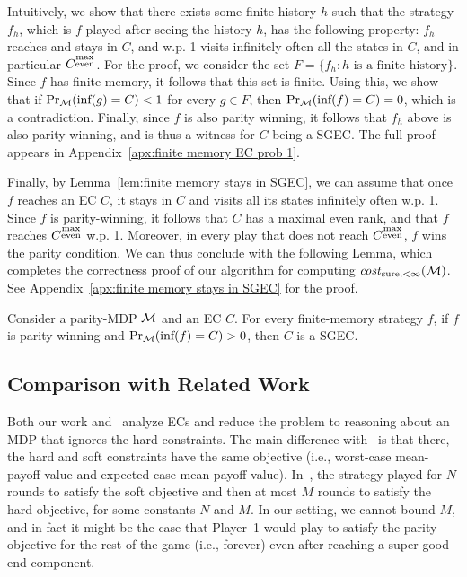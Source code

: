 \documentclass[runningheads,a4paper]{llncs}
\newcommand{\set}[1]{{\{#1\}}}
\newcommand{\M}{{\cal M}}
\newcommand{\Inf}{\mbox{inf}}
\newcommand{\costsf}{{\it cost}_{\rm sure,<\infty}}
\newcommand{\sgec}{{SGEC}\xspace}
\newcommand{\me}{{\substack{\rm max\\ \rm even}}}
\begin{document}
Intuitively, we show that there exists some finite history $h$ such that the strategy $f_h$, which is $f$ played after seeing the history $h$, has the following property: $f_h$ reaches and stays in $C$, and w.p. 1 visits infinitely often all the states in $C$, and in particular $C^{\me}$. 
For the proof, we consider the set $F=\set{f_h:h\text{ is a finite history}}$. Since $f$ has finite memory, it follows that this set is finite. Using this, we show that if $\Pr_\M(\Inf(g)=C)<1$ for every $g\in F$, then $\Pr_\M(\Inf(f)=C)=0$, which is a contradiction. 
Finally, since $f$ is also parity winning, it follows that $f_h$ above is also parity-winning, and is thus a witness for $C$ being a \sgec. 
The full proof appears in Appendix~\ref{apx:finite memory EC prob 1}.

Finally, by Lemma~\ref{lem:finite memory stays in SGEC}, we can assume that once $f$ reaches an EC $C$, it stays in $C$ and visits all its states infinitely often w.p. 1. Since $f$ is parity-winning, it follows that $C$ has a maximal even rank, and that $f$ reaches $C^{\me}$ w.p. 1. Moreover, in every play that does not reach $C^{\me}$, $f$ wins the parity condition. We can thus conclude with the following Lemma, which completes the correctness proof of our algorithm for computing $\costsf(\M)$. See Appendix~\ref{apx:finite memory stays in SGEC} for the proof.
\vspace*{-5pt}
\begin{lemma}
\label{lem:finite memory stays in SGEC}
Consider a parity-MDP $\M$ and an EC $C$. For every finite-memory strategy $f$, if $f$ is parity winning and $\Pr_{\M}(\Inf(f)=C)>0$, then $C$ is a \sgec.
\end{lemma}


\vspace*{-20pt}
\subsection{Comparison with Related Work}
\label{subsec:overview_discussion}
Both our work and~\cite{BFRR14a,CR15} analyze ECs and reduce the problem to reasoning about an MDP that ignores the hard constraints.
The main difference with~\cite{BFRR14a} is that there, the hard and soft constraints have the same objective (i.e., worst-case mean-payoff value and expected-case mean-payoff value).
In~\cite{BFRR14a}, the strategy played for $N$ rounds to satisfy the soft objective and then at most $M$ rounds to satisfy the hard objective, for some constants $N$ and $M$.
In our setting, we cannot bound $M$, and in fact it might be the case that Player~1 would play to satisfy the parity objective for the rest of the game (i.e., forever) even after reaching a super-good end component.
\end{document}
